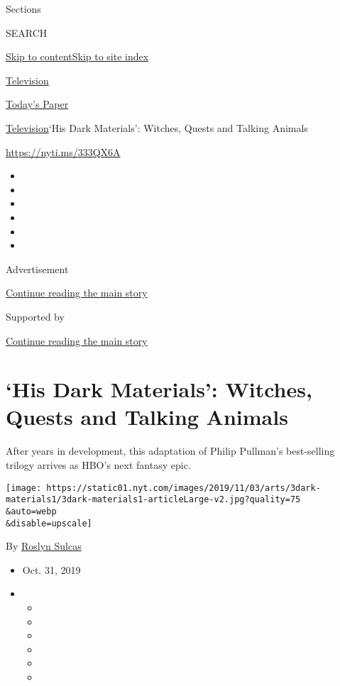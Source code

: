 Sections

SEARCH

\protect\hyperlink{site-content}{Skip to
content}\protect\hyperlink{site-index}{Skip to site index}

\href{https://www.nytimes.com/section/arts/television}{Television}

\href{https://myaccount.nytimes.com/auth/login?response_type=cookie\&client_id=vi}{}

\href{https://www.nytimes.com/section/todayspaper}{Today's Paper}

\href{/section/arts/television}{Television}\textbar{}`His Dark
Materials': Witches, Quests and Talking Animals

\href{https://nyti.ms/333QX6A}{https://nyti.ms/333QX6A}

\begin{itemize}
\item
\item
\item
\item
\item
\item
\end{itemize}

Advertisement

\protect\hyperlink{after-top}{Continue reading the main story}

Supported by

\protect\hyperlink{after-sponsor}{Continue reading the main story}

\hypertarget{his-dark-materials-witches-quests-and-talking-animals}{%
\section{`His Dark Materials': Witches, Quests and Talking
Animals}\label{his-dark-materials-witches-quests-and-talking-animals}}

After years in development, this adaptation of Philip Pullman's
best-selling trilogy arrives as HBO's next fantasy epic.

\texttt{[image: https://static01.nyt.com/images/2019/11/03/arts/3dark-materials1/3dark-materials1-articleLarge-v2.jpg?quality=75\\\&auto=webp\\\&disable=upscale]}

By \href{https://www.nytimes.com/by/roslyn-sulcas}{Roslyn Sulcas}

\begin{itemize}
\item
  Oct. 31, 2019
\item
  \begin{itemize}
  \item
  \item
  \item
  \item
  \item
  \item
  \end{itemize}
\end{itemize}

